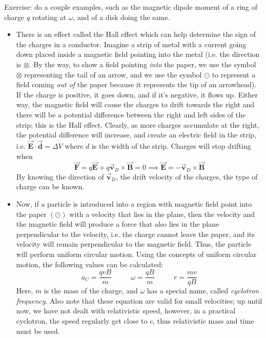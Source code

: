 \documentclass{scrartcl}
\begin{document}
    Exercise: do a couple examples, such as the magnetic dipole moment of a ring of charge $q$ rotating at $\omega$, and of a disk doing the same.
    \begin{itemize}
        \item There is an effect called the Hall effect which can help determine the sign of the charges in a conductor. Imagine a strip of metal with a current going down placed inside a magnetic field pointing into the metal (i.e. the direction is $\otimes$. By the way, to show a field pointing \textit{into} the paper, we use the symbol $\otimes$ representing the tail of an arrow, and we use the symbol $\odot$ to represent a field coming \textit{out of} the paper because it represents the tip of an arrowhead). If the charge is positive, it goes down, and if it's negative, it flows up. Either way, the magnetic field will cause the charges to drift towards the right and there will be a potential difference between the right and left sides of the strip; this is the Hall effect. Clearly, as more charges accumulate at the right, the potential difference will increase, and create an electric field in the strip, i.e. $\vec{\mathbf E}\cdot\vec{\mathbf d}=\Delta V$ where $d$ is the width of the strip. Charges will stop drifting when \[\vec{\mathbf F}=q\vec{\mathbf E}+q\vec{\mathbf v}_D\times\vec{\mathbf B}=0\implies\vec{\mathbf E}=-\vec{\mathbf v}_D\times\vec{\mathbf B}\] By knowing the direction of $\vec{\mathbf v}_D$, the drift velocity of the charges, the type of charge can be known.
        \item Now, if a particle is introduced into a region with magnetic field point into the paper $\left(\odot\right)$ with a velocity that lies in the plane, then the velocity and the magnetic field will produce a force that also lies in the plane perpendicular to the velocity, i.e. the charge cannot leave the paper, and its velocity will remain perpendicular to the magnetic field. Thus, the particle will perform uniform circular motion. Using the concepts of uniform circular motion, the following values can be calculated: \[\boxed{a_C=\frac{qvB}m\textrm{ }\textrm{ }\textrm{ }\textrm{ }\omega=\frac{qB}m\textrm{ }\textrm{ }\textrm{ }\textrm{ }r=\frac{mv}{qB}}\] Here, $m$ is the mass of the charge, and $\omega$ has a special name, called \textit{cyclotron frequency}. Also note that these equation are valid for small velocities; up until now, we have not dealt with relativistic speed, however, in a practical cyclotron, the speed regularly get close to $c$, thus relativistic mass and time must be used.
    \end{itemize}
\end{document}
